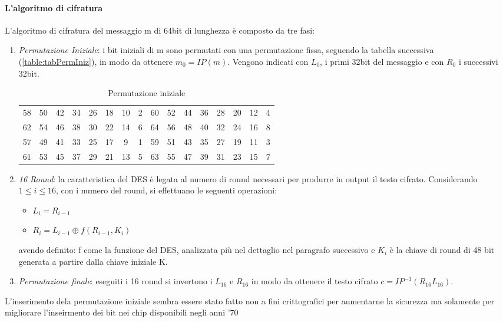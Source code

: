 \documentclass[11pt, a4paper, oneside]{Thesis} %
\begin{document}
\paragraph{L'algoritmo di cifratura} L'algoritmo di cifratura del messaggio m di 64bit di lunghezza è composto da tre fasi:
\begin{enumerate}
 \item \textit{Permutazione Iniziale}: i bit iniziali di m sono permutati con una permutazione fissa, seguendo la tabella successiva (\autoref{table:tabPermIniz}),
 in modo da ottenere $ m_0 = IP(m)$.
 Vengono indicati con $L_0$, i primi 32bit del messaggio e con $R_0$ i successivi 32bit.
      \begin{table}[ht] 
      \caption{Permutazione iniziale} %
      \centering %
      \begin{tabular}{c c c c c c c c c c c c c c c c} %
      \hline %
      58 & 50 & 42 & 34 & 26 & 18 & 10 & 2 & 60 & 52 & 44 & 36 & 28 & 20 & 12 & 4 \\
      62 & 54 & 46 & 38 & 30 & 22 & 14 & 6 & 64 & 56 & 48 & 40 & 32 & 24 & 16 & 8 \\
      57 & 49 & 41 & 33 & 25 & 17 &  9 & 1 & 59 & 51 & 43 & 35 & 27 & 19 & 11 & 3 \\
      61 & 53 & 45 & 37 & 29 & 21 & 13 & 5 & 63 & 55 & 47 & 39 & 31 & 23 & 15 & 7 \\
      \hline %
      \end{tabular} 
      \label{table:tabPermIniz} %
      \end{table}

 \item \textit{16 Round}: la caratteristica del DES è legata al numero di round necessari per produrre in output il testo cifrato. Considerando $1\le i \le 16$, con i numero del round, 
 si effettuano le seguenti operazioni:
 \begin{itemize}
  \item $ L_i = R_{i-1} $
  \item $ R_i = L_{i-1} \oplus f(R_{i-1}, K_i) $
 \end{itemize}
 avendo definito: f come la funzione del DES, analizzata più nel dettaglio nel paragrafo successivo e $K_i$ è la chiave di round di 48 bit generata a partire dalla chiave iniziale K.
 \item \textit{Permutazione finale}: eseguiti i 16 round si invertono i $L_{16}$ e $R_{16}$ in modo da ottenere il testo cifrato $c=IP^{-1}(R_{16}L_{16})$.
\end{enumerate}
L'inserimento dela permutazione iniziale sembra essere stato fatto non a fini crittografici per aumentarne la sicurezza ma solamente per migliorare l'inseirmento dei bit nei chip
disponibili negli anni '70
\end{document}
